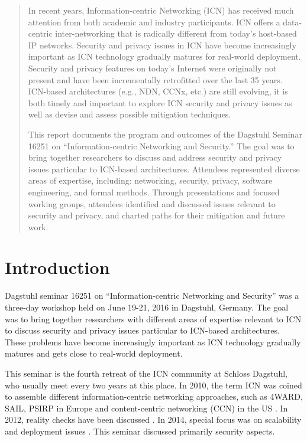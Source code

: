 \documentclass{sig-alternate-10pt}
\makeatletter
\renewcommand{\paragraph}[1]{\vspace*{0.03in}\noindent{\bf #1.}\hspace{0.25ex \@plus1ex \@minus.2ex}}
\makeatother
\begin{document}
\begin{abstract}
In recent years, Information-centric Networking (ICN) has received much attention from
both academic and industry participants. ICN offers a data-centric inter-networking
that is radically different from today's host-based IP networks. Security and privacy issues
in ICN have become increasingly important as ICN technology gradually matures for
real-world deployment. Security and privacy features on today's Internet
were originally not present and have been incrementally retrofitted
over the last 35 years. ICN-based architectures
(e.g., NDN, CCNx, etc.) are still evolving, it is both timely and important to explore
ICN security and privacy issues as well as devise and assess possible mitigation techniques.

This report documents the program and outcomes of the Dagstuhl Seminar 16251
on ``Information-centric Networking and Security.'' The goal was to bring together
researchers to discuss and address security and privacy issues particular to ICN-based
architectures. Attendees represented diverse areas of expertise, including: networking,
security, privacy, software engineering, and formal methods. Through presentations and
focused working groups, attendees identified and discussed issues relevant to security
and privacy, and charted paths for their mitigation and future work.
\end{abstract}

\section{Introduction}
Dagstuhl seminar 16251 on ``Information-centric Networking and Security'' was a three-day
workshop held on June 19-21, 2016 in Dagstuhl, Germany. The goal was to bring together researchers with
different areas of expertise relevant to ICN to discuss security and privacy issues
particular to ICN-based architectures. These problems have become increasingly
important as ICN technology gradually matures and gets close to real-world deployment.

\paragraph{Brief History of Dagstuhl Seminars on ICN}
This seminar is the fourth retreat of the ICN community at Schloss Dagstuhl, who
usually meet every two years at this place. In 2010, the term ICN was
coined to assemble different informa\-tion-centric networking approaches,
such as 4WARD, SAIL, PSIRP in Europe and content-centric networking (CCN) in the US \cite{dagstuhl2010}.
In 2012, reality checks have been discussed \cite{dagstuhl2012}. In 2014, special focus was on scalability
and deployment issues \cite{dagstuhl2014}. This seminar discussed primarily security aspects.
\end{document}
